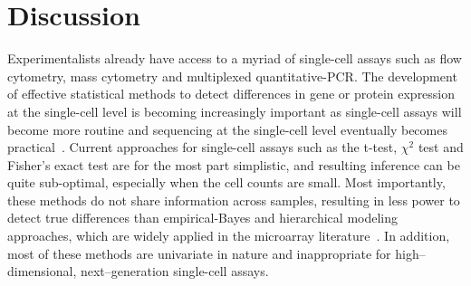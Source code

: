 \documentclass[12pt,oupdraft]{biostatistics}
\begin{document}
%

\section{Discussion}
\label{s:discussion}
Experimentalists already have access to a myriad of single-cell assays such as flow cytometry, mass cytometry and multiplexed quantitative-PCR. The development of effective statistical methods to detect differences in gene or protein expression at the single-cell level is becoming increasingly important as single-cell assays will become more routine and  sequencing at the single-cell level eventually becomes practical~\citep{Ramskold:2012gj}. Current approaches for single-cell assays such as the t-test, $\chi^2$ test and Fisher's exact test are for the most part simplistic, and resulting inference can be quite sub-optimal, especially when the cell counts are small. Most importantly, these methods do not share information across samples, resulting in less power to detect true differences than empirical-Bayes and hierarchical modeling approaches, which are widely applied in the microarray literature~\citep{Kendziorski:2003uw,Newton:2001go,Smyth:2005iy,Gottardo:2006}. In addition, most of these methods are univariate in nature and inappropriate for high--dimensional, next--generation single-cell assays.
\end{document}
